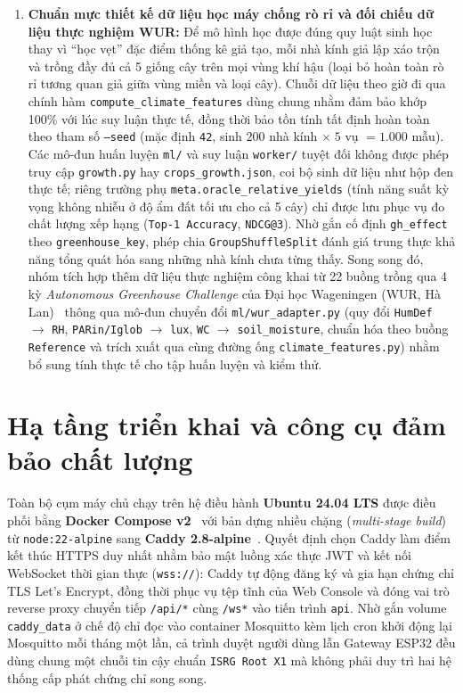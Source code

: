 \begin{enumerate}[leftmargin=*]
    \item \textbf{Chuẩn mực thiết kế dữ liệu học máy chống rò rỉ và đối chiếu dữ liệu thực nghiệm WUR:} Để mô hình học được đúng quy luật sinh học thay vì ``học vẹt'' đặc điểm thống kê giả tạo, mỗi nhà kính giả lập xáo trộn và trồng đầy đủ cả 5 giống cây trên mọi vùng khí hậu (loại bỏ hoàn toàn rò rỉ tương quan giả giữa vùng miền và loại cây). Chuỗi dữ liệu theo giờ đi qua chính hàm \texttt{compute\_climate\_features} dùng chung nhằm đảm bảo khớp 100\% với lúc suy luận thực tế, đồng thời bảo tồn tính tất định hoàn toàn theo tham số \texttt{--seed} (mặc định \texttt{42}, sinh \(200\) nhà kính \(\times\; 5\) vụ \(= 1.000\) mẫu). Các mô-đun huấn luyện \texttt{ml/} và suy luận \texttt{worker/} tuyệt đối không được phép truy cập \texttt{growth.py} hay \texttt{crops\_growth.json}, coi bộ sinh dữ liệu như hộp đen thực tế; riêng trường phụ \texttt{meta.oracle\_relative\_yields} (tính năng suất kỳ vọng không nhiễu ở độ ẩm đất tối ưu cho cả 5 cây) chỉ được lưu phục vụ đo chất lượng xếp hạng (\texttt{Top-1 Accuracy}, \texttt{NDCG@3}). Nhờ gắn cố định \texttt{gh\_effect} theo \texttt{greenhouse\_key}, phép chia \texttt{GroupShuffleSplit} đánh giá trung thực khả năng tổng quát hóa sang những nhà kính chưa từng thấy. Song song đó, nhóm tích hợp thêm dữ liệu thực nghiệm công khai từ 22 buồng trồng qua 4 kỳ \textit{Autonomous Greenhouse Challenge} của Đại học Wageningen (WUR, Hà Lan)~\cite{wurChallengeDataset} thông qua mô-đun chuyển đổi \texttt{ml/wur\_adapter.py} (quy đổi \texttt{HumDef} \(\rightarrow\) \texttt{RH}, \texttt{PARin/Iglob} \(\rightarrow\) \texttt{lux}, \texttt{WC} \(\rightarrow\) \texttt{soil\_moisture}, chuẩn hóa theo buồng \texttt{Reference} và trích xuất qua cùng đường ống \texttt{climate\_features.py}) nhằm bổ sung tính thực tế cho tập huấn luyện và kiểm thử.
\end{enumerate}

\section{Hạ tầng triển khai và công cụ đảm bảo chất lượng}
\label{sec:c2-devops}

Toàn bộ cụm máy chủ chạy trên hệ điều hành \textbf{Ubuntu 24.04 LTS} được điều phối bằng \textbf{Docker Compose v2}~\cite{dockerDocs} với bản dựng nhiều chặng (\textit{multi-stage build}) từ \texttt{node:22-alpine} sang \textbf{Caddy 2.8-alpine}~\cite{caddyDocs}. Quyết định chọn Caddy làm điểm kết thúc HTTPS duy nhất nhằm bảo mật luồng xác thực JWT và kết nối WebSocket thời gian thực (\texttt{wss://}): Caddy tự động đăng ký và gia hạn chứng chỉ TLS Let's Encrypt, đồng thời phục vụ tệp tĩnh của Web Console và đóng vai trò reverse proxy chuyển tiếp \texttt{/api/*} cùng \texttt{/ws*} vào tiến trình \texttt{api}. Nhờ gắn volume \texttt{caddy\_data} ở chế độ chỉ đọc vào container Mosquitto kèm lịch cron khởi động lại Mosquitto mỗi tháng một lần, cả trình duyệt người dùng lẫn Gateway ESP32 đều dùng chung một chuỗi tin cậy chuẩn \texttt{ISRG Root X1} mà không phải duy trì hai hệ thống cấp phát chứng chỉ song song.

